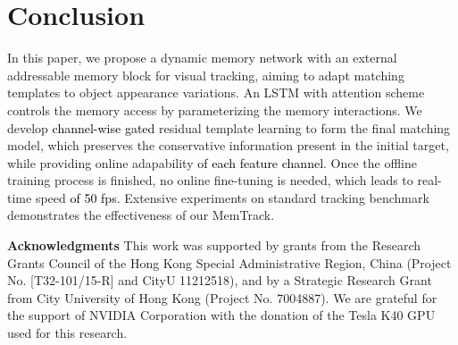 \documentclass[runningheads]{llncs}
\newcommand{\abc}[1]{\textcolor{black}{#1}}
\newcommand{\abcn}[1]{\textcolor{black}{#1}}
\begin{document}
\section{Conclusion}
In this paper, we propose a dynamic memory network with an external addressable memory block for visual tracking, aiming to adapt matching templates to object appearance variations. %
An LSTM with attention scheme controls the memory access by parameterizing the memory interactions. We develop \abc{channel-wise gated} residual template learning to form the final matching model, which preserves the conservative information present in the initial target, while providing online adapability \abc{of each feature channel}. Once the offline training process is finished, no online fine-tuning %
is needed, %
which leads to real-time speed \abcn{of 50 fps}. Extensive experiments on standard tracking benchmark demonstrates the effectiveness %
of our MemTrack.

\noindent \textbf{Acknowledgments} This work was supported by grants from the Research Grants Council of the Hong Kong Special Administrative Region, China (Project No. [T32-101/15-R] and CityU 11212518), and by a Strategic Research Grant from City University of Hong Kong (Project No. 7004887). We are grateful for the support of NVIDIA Corporation with the donation of the Tesla K40 GPU used for this research.
\clearpage



\end{document}
